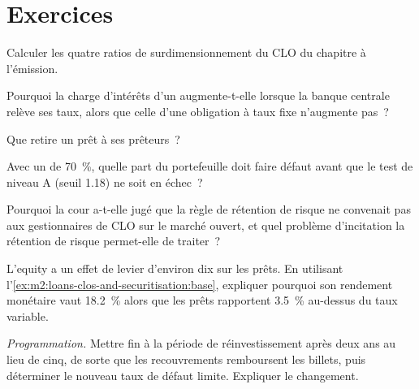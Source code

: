 \section{Exercices}

\begin{exercise}[$\star$]\label{exo:m2:loans-clos-and-securitisation:1}
Calculer les quatre ratios de surdimensionnement du CLO du chapitre à l'émission.
\end{exercise}

\begin{exercise}[$\star$]\label{exo:m2:loans-clos-and-securitisation:2}
Pourquoi la charge d'intérêts d'un  augmente-t-elle lorsque la banque centrale relève ses taux, alors
que celle d'une obligation à taux fixe n'augmente pas~?
\end{exercise}

\begin{exercise}[$\star$]\label{exo:m2:loans-clos-and-securitisation:3}
Que retire un prêt  à ses prêteurs~?
\end{exercise}

\begin{exercise}[$\star\star$]\label{exo:m2:loans-clos-and-securitisation:4}
Avec un  de 70~\%, quelle part du portefeuille doit faire défaut avant
que le test de niveau A (seuil 1.18) ne soit en échec~?
\end{exercise}

\begin{exercise}[$\star\star$]\label{exo:m2:loans-clos-and-securitisation:5}
Pourquoi la cour a-t-elle jugé que la règle de rétention de risque ne convenait pas
aux gestionnaires de CLO sur le marché ouvert, et quel problème d'incitation la rétention de risque permet-elle de traiter~?
\end{exercise}

\begin{exercise}[$\star\star$]\label{exo:m2:loans-clos-and-securitisation:6}
L'equity a un effet de levier d'environ dix sur les prêts. En utilisant l'\cref{ex:m2:loans-clos-and-securitisation:base},
expliquer pourquoi son rendement monétaire vaut 18.2~\% alors que les prêts rapportent 3.5~\% au-dessus du taux variable.
\end{exercise}

\begin{exercise}[$\star\star\star$]\label{exo:m2:loans-clos-and-securitisation:7}
\emph{Programmation.} Mettre fin à la période de réinvestissement après deux ans au lieu de cinq, de sorte que
les recouvrements remboursent les billets, puis déterminer le nouveau taux de défaut limite. Expliquer le changement.
\end{exercise}

